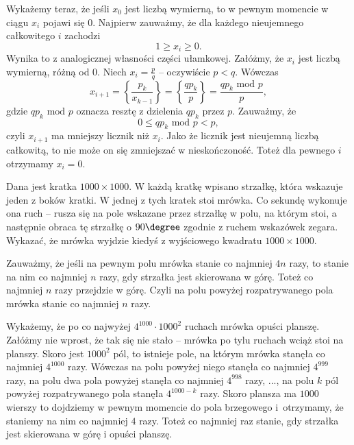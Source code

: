\vspace{10px}
\noindent
Wykażemy teraz, że jeśli $x_0$ jest liczbą wymierną, to w pewnym momencie w ciągu $x_i$ pojawi się $0$. Najpierw zauważmy, że dla każdego nieujemnego całkowitego $i$ zachodzi 
\[
	1 \geqslant x_i \geqslant 0.
\] 
Wynika to z analogicznej własności części ułamkowej. Załóżmy, że $x_i$ jest liczbą wymierną, różną od 0. Niech $x_i = \frac{p}{q}$ -- oczywiście $p < q$. Wówczas
\[
	x_{i + 1} = \left\{ \dfrac{p_k}{x_{k-1}} \right\} = \left\{ \dfrac{qp_k}{p} \right\} = \frac{qp_k \text{ mod } p}{p},
\]
gdzie $qp_k \text{ mod } p$ oznacza resztę z dzielenia $qp_k$ przez $p$. Zauważmy, że
\[
	0 \leqslant qp_k \text{ mod } p < p,
\]
czyli $x_{i + 1}$ ma mniejszy licznik niż $x_i$. Jako że licznik jest nieujemną liczbą całkowitą, to nie może on się zmniejszać w nieskończoność. Toteż dla pewnego $i$ otrzymamy $x_i = 0$.

\begin{problem}{4}
	Dana jest kratka $1000\times 1000$. W każdą kratkę wpisano strzałkę, która wskazuje jeden z boków kratki. W jednej z tych kratek stoi mrówka. Co sekundę wykonuje ona ruch -- rusza się na pole wskazane przez strzałkę w polu, na którym stoi, a następnie obraca tę strzałkę o $90\degree$ zgodnie z ruchem wskazówek zegara. Wykazać, że mrówka wyjdzie kiedyś z wyjściowego kwadratu $1000\times 1000$.
\end{problem}

\noindent
Zauważmy, że jeśli na pewnym polu mrówka stanie co najmniej $4n$ razy, to stanie na nim co najmniej $n$ razy, gdy strzałka jest skierowana w górę. Toteż co najmniej $n$ razy przejdzie w górę. Czyli na polu powyżej rozpatrywanego pola mrówka stanie co najmniej $n$ razy.

\vspace{10px}
\noindent
Wykażemy, że po co najwyżej $4^{1000} \cdot 1000^2$ ruchach mrówka opuści planszę. Załóżmy nie wprost, że tak się nie stało -- mrówka po tylu ruchach wciąż stoi na planszy. Skoro jest $1000^2$ pól, to istnieje pole, na którym mrówka stanęła co najmniej $4^{1000}$ razy. Wówczas na polu powyżej niego stanęła co najmniej $4^{999}$ razy, na polu dwa pola powyżej stanęła co najmniej $4^{998}$ razy, ..., na polu $k$ pól powyżej rozpatrywanego pola stanęła $4^{1000 - k}$ razy. Skoro plansza ma $1000$ wierszy to dojdziemy w pewnym momencie do pola brzegowego i~otrzymamy, że staniemy na nim co najmniej $4$ razy. Toteż co najmniej raz stanie, gdy strzałka jest skierowana w górę i opuści planszę.
\vspace{5px}

